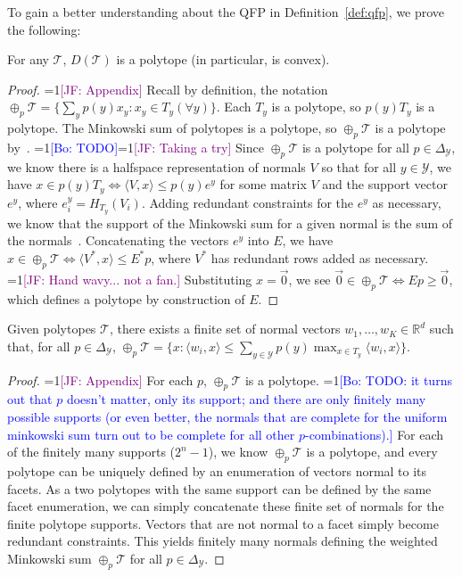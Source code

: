 \documentclass[anon]{colt2020} %
\newcommand{\Comments}{1}
\newcommand{\mynote}[2]{\ifnum\Comments=1\textcolor{#1}{#2}\fi}
\newcommand{\jessie}[1]{\mynote{purple}{[JF: #1]}}
\newcommand{\bo}[1]{\mynote{blue}{[Bo: #1]}}
\newcommand{\reals}{\mathbb{R}}
\newcommand{\simplex}{\Delta_\Y}
\newcommand{\T}{\mathcal{T}}
\newcommand{\Y}{\mathcal{Y}}
\newcommand{\inprod}[2]{\langle #1, #2 \rangle}%
\begin{document}
To gain a better understanding about the QFP in Definition~\ref{def:qfp}, we prove the following:
\begin{lemma} \label{lemma:D-polytope}
  For any $\T$, $D(\T)$ is a polytope (in particular, is convex).
\end{lemma}
\begin{proof}
  \jessie{Appendix}
   Recall by definition, the notation $\oplus_p \T = \{\sum_y p(y) x_y : x_y \in T_y (\forall y)\}$.
   Each $T_y$ is a polytope, so $p(y) T_y$ is a polytope.
   The Minkowski sum of polytopes is a polytope, so $\oplus_p \T$ is a polytope by~\cite[Section 1.2]{weibel2007minkowski}.
  \bo{TODO}\jessie{Taking a try}
  Since $\oplus_p \T$ is a polytope for all $p \in \simplex$, we know there is a halfspace representation of normals $V$ so that for all $y \in \Y$, we have $x \in p(y)T_y \iff \inprod{V}{x} \leq p(y) e^y$ for some matrix $V$ and the support vector $e^y$, where $e^y_i = H_{T_y}(V_i)$.
  Adding redundant constraints for the $e^y$ as necessary, we know that the support of the Minkowski sum for a given normal is the sum of the normals~\cite[Theorem 3.1.6]{weibel2007minkowski}.
  Concatenating the vectors $e^y$ into $E$, we have $x \in \oplus_p \T \iff \inprod{V^*}{x} \leq E^*p$, where $V^*$ has redundant rows added as necessary. \jessie{Hand wavy... not a fan.}
  Substituting $x = \vec 0$, we see $\vec 0 \in \oplus_p \T \iff Ep \geq \vec 0$, which defines a polytope by construction of $E$.
\end{proof}
\begin{lemma}  \label{lemma:minkowski-support}
  Given polytopes $\T$, there exists a finite set of normal vectors $w_1,\ldots,w_K \in \reals^d$ such that, for all $p \in \simplex$, $\oplus_p \T = \{x : \inprod{w_i}{x} \leq \sum_{y \in \Y} p(y) \max_{x \in T_y} \inprod{w_i}{x} \}$.
\end{lemma}
\begin{proof}
  \jessie{Appendix}
   For each $p$, $\oplus_p \T$ is a polytope.
  \bo{TODO: it turns out that $p$ doesn't matter, only its support; and there are only finitely many possible supports (or even better, the normals that are complete for the uniform minkowski sum turn out to be complete for all other $p$-combinations).}
  For each of the finitely many supports ($2^n - 1$), we know $\oplus_p \T$ is a polytope, and every polytope can be uniquely defined by an enumeration of vectors normal to its facets.
  As a two polytopes with the same support can be defined by the same facet enumeration, we can simply concatenate these finite set of normals for the finite polytope supports.
  Vectors that are not normal to a facet simply become redundant constraints.
  This yields finitely many normals defining the weighted Minkowski sum $\oplus_p \T$ for all $p \in \simplex$.
\end{proof}
\end{document}
